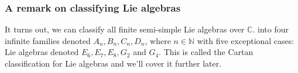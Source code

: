 \subsubsection*{A remark on classifying Lie algebras}

It turns out, we can classify all finite semi-simple Lie algebras over $\mathbb{C}$. into four infinite families denoted $A_n, B_n, C_n, D_n$, where $n \in \mathbb{N}$ with five exceptional cases: Lie algebras denoted $E_6, E_7, E_8, G_2$ and $G_4$. This is called the Cartan classification for Lie algebras and we'll cover it further later.  

